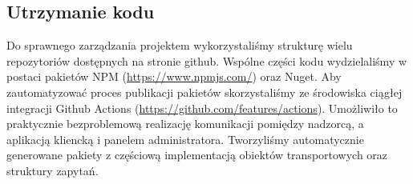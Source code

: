\documentclass[../opis-rozwiazania.tex]{subfiles}
\begin{document}
\subsection{Utrzymanie kodu}
Do sprawnego zarządzania projektem wykorzystaliśmy strukturę wielu repozytoriów dostępnych na stronie github.
Wspólne części kodu wydzielaliśmy w postaci pakietów NPM (\url{https://www.npmjs.com/}) oraz Nuget.
Aby zautomatyzować proces publikacji pakietów skorzystaliśmy ze środowiska ciągłej integracji Github Actions (\url{https://github.com/features/actions}).
Umożliwiło to praktycznie bezproblemową realizację komunikacji pomiędzy nadzorcą, a aplikacją kliencką i panelem administratora.
Tworzyliśmy automatycznie generowane pakiety z częściową implementacją obiektów transportowych oraz struktury zapytań.
\end{document}
